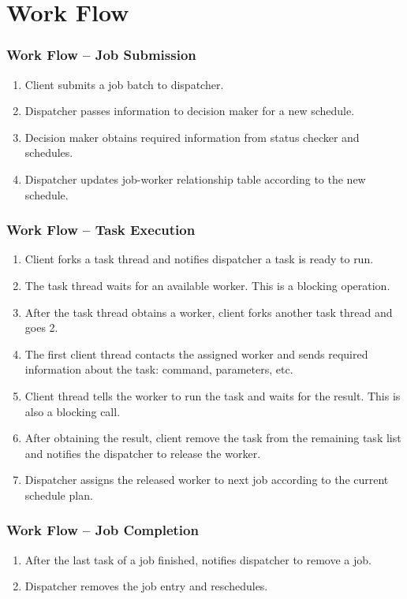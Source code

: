 \section{Work Flow}
\begin{frame}
  \frametitle{Work Flow -- Job Submission}
  \begin{enumerate}
    \item Client submits a job batch to dispatcher.
    \item Dispatcher passes information to decision maker for a new
      schedule.
    \item Decision maker obtains required information from status
      checker and schedules.
    \item Dispatcher updates job-worker relationship table according to
      the new schedule.
  \end{enumerate}
\end{frame}
\begin{frame}
  \frametitle{Work Flow -- Task Execution}
  \begin{enumerate}
    \item Client forks a task thread and notifies dispatcher a task is
      ready to run.
    \item The task thread waits for an available worker. This is a
      blocking operation.
    \item After the task thread obtains a worker, client forks another
      task thread and goes 2.
    \item The first client thread contacts the assigned worker and sends
      required information about the task: command, parameters, etc.
    \item Client thread tells the worker to run the task and waits for
      the result. This is also a blocking call.
    \item After obtaining the result, client remove the task from the
      remaining task list and notifies the dispatcher to release the
      worker.
    \item Dispatcher assigns the released worker to next job
      according to the current schedule plan.
  \end{enumerate}
\end{frame}
\begin{frame}
  \frametitle{Work Flow -- Job Completion}
  \begin{enumerate}
    \item After the last task of a job finished, notifies dispatcher to
      remove a job.
    \item Dispatcher removes the job entry and reschedules.
  \end{enumerate}
\end{frame}
